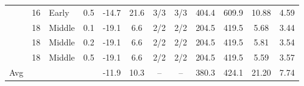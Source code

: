 \begin{table}[p]
{\begin{tabular}{lllc|cc|cc|cc|cc}
 & 16 & Early & 0.5 & -14.7 & 21.6 & 3/3 & 3/3 & 404.4 & 609.9 & 10.88 & 4.59 \\
 & 18 & Middle & 0.1 & -19.1 & 6.6 & 2/2 & 2/2 & 204.5 & 419.5 & 5.68 & 3.44 \\
 & 18 & Middle & 0.2 & -19.1 & 6.6 & 2/2 & 2/2 & 204.5 & 419.5 & 5.81 & 3.54 \\
 & 18 & Middle & 0.5 & -19.1 & 6.6 & 2/2 & 2/2 & 204.5 & 419.5 & 5.59 & 3.57 \\
\midrule
Avg &  &  &  & -11.9 & 10.3 & -- & -- & 380.3 & 424.1 & 21.20 & 7.74 \\
\bottomrule
\end{tabular}%
}
\end{table}
